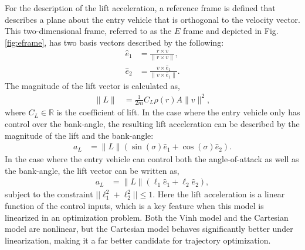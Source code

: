 For the description of the lift acceleration, a reference frame is defined that describes a plane about the entry vehicle that is orthogonal to the velocity vector.  This two-dimensional frame, referred to as the $E$ frame and depicted in Fig. \ref{fig:eframe}, has two basis vectors described by the following:
\begin{align}
    \hat{e}_1 &=  \frac{r \times v}{\|r \times v\|}, \\ 
    \hat{e}_2 &= \frac{v \times \hat{e}_1}{\| v \times \hat{e}_1 \|} .
\end{align}
The magnitude of the lift vector is calculated as,
\begin{align}
    \|L\| &= \frac{1}{2m} C_L \rho(r) A \|v\|^2,
\end{align}
where $C_L \in \mathbb{R}$ is the coefficient of lift. In the case where the entry vehicle only has control over the bank-angle, the resulting lift acceleration can be described by the magnitude of the lift and the bank-angle:
\begin{align}
    a_L &= \|L\|(\sin(\sigma)\hat{e}_1 + \cos(\sigma)\hat{e}_2). \label{eq:bao}
\end{align}
 In the case where the entry vehicle can control both the angle-of-attack as well as the bank-angle, the lift vector can be written as,
\begin{align}
    a_L &= \|L\|(\ell_1\hat{e}_1 + \ell_2\hat{e}_2), \label{eq:fl}
\end{align}
subject to the constraint $||\ell_1^2 + \ell_2^2|| \leq 1$.
Here the lift acceleration is a linear function of the control inputs, which is a key feature when this model is linearized in an optimization problem. Both the Vinh model and the Cartesian model are nonlinear, but the Cartesian model behaves significantly better under linearization, making it a far better candidate for trajectory optimization.



